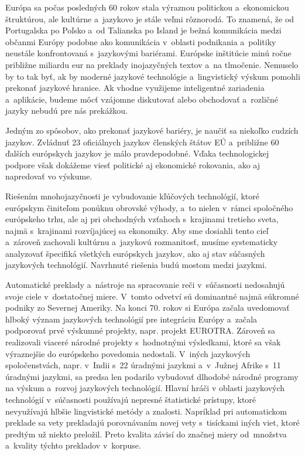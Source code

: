 \cleardoublepage

\setcounter{page}{1}
\pagestyle{scrheadings}

\begin{multicols}{2}
Európa sa počas posledných 60 rokov stala výraznou politickou
a~ekonomickou štruktúrou, ale kultúrne a~jazykovo je stále
veľmi rôznorodá. To znamená, že od Portugalska po Poľsko
a~od Talianska po Island je bežná komunikácia medzi občanmi Európy podobne ako komunikácia v~oblasti podnikania a~politiky neustále konfrontovaná s~jazykovými bariérami. Európske inštitúcie minú ročne približne miliardu eur na preklady inojazyčných textov a~na tlmočenie. Nemuselo by to tak byť, ak by moderné jazykové technológie a~lingvistický výskum pomohli prekonať jazykové hranice. Ak vhodne využijeme inteligentné zariadenia a~aplikácie, budeme môcť vzájomne diskutovať alebo obchodovať a~rozličné jazyky nebudú pre nás prekážkou.


Jedným zo spôsobov, ako prekonať jazykové bariéry, je naučiť sa
niekoľko cudzích jazykov. Zvládnuť 23 oficiálnych jazykov
členských štátov EÚ a~približne 60 ďalších európskych jazykov
je málo pravdepodobné. Vďaka technologickej podpore však dokážeme
viesť politické aj ekonomické rokovania, ako aj napredovať vo
výskume.

Riešením mnohojazyčnosti je vybudovanie kľúčových technológií,
ktoré európskym činiteľom ponúknu obrovské výhody, a~to nielen
v~rámci spoločného európskeho trhu, ale aj pri obchodných vzťahoch
s~krajinami  tretieho sveta, najmä s~krajinami rozvíjajúcej sa
ekonomiky. Aby sme dosiahli tento cieľ a~zároveň zachovali kultúrnu
a~jazykovú rozmanitosť, musíme systematicky analyzovať špecifiká
všetkých európskych jazykov, ako aj stav súčasných jazykových
technológií. Navrhnuté riešenia budú mostom medzi jazykmi.

Automatické preklady a~nástroje na spracovanie reči
v~súčasnosti nedosahujú svoje ciele v~dostatočnej miere. V~tomto
odvetví sú dominantné najmä súkromné podniky zo Severnej Ameriky.
Na konci 70. rokov si Európa začala uvedomovať hlboký význam
jazykových technológií pre integráciu Európy a~začala podporovať
prvé výskumné projekty, napr. projekt EUROTRA. Zároveň sa
realizovali viaceré národné projekty s~hodnotnými výsledkami,
ktoré sa však výraznejšie do európskeho povedomia nedostali.
V~iných jazykových spoločenstvách, napr. v~Indii s~22 úradnými
jazykmi a~v~Južnej Afrike s~11 úradnými jazykmi, sa predsa len
podarilo vybudovať dlhodobé národné programy na výskum a~rozvoj
jazykových technológií.
Hlavní hráči v oblasti jazykových technológií v~súčasnosti
používajú nepresné štatistické prístupy, ktoré nevyužívajú
hlbšie lingvistické metódy a znalosti.
Napríklad pri automatickom preklade sa vety 
prekladajú porovnávaním novej vety s~tisíckami iných viet, ktoré
predtým už niekto preložil. Preto kvalita závisí do značnej miery
od~množstva a~kvality týchto prekladov v~korpuse.


\end{multicols}
